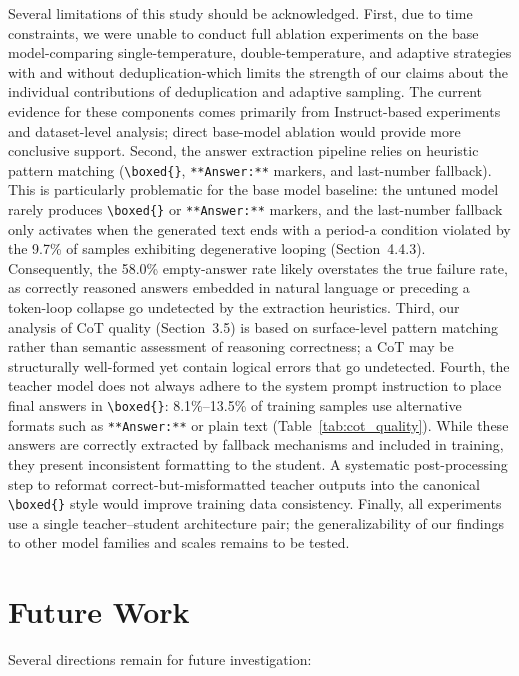 \documentclass{article}
\begin{document}
Several limitations of this study should be acknowledged. First, due to time constraints, we were unable to conduct full ablation experiments on the base model-comparing single-temperature, double-temperature, and adaptive strategies with and without deduplication-which limits the strength of our claims about the individual contributions of deduplication and adaptive sampling. The current evidence for these components comes primarily from Instruct-based experiments and dataset-level analysis; direct base-model ablation would provide more conclusive support. Second, the answer extraction pipeline relies on heuristic pattern matching (\texttt{\textbackslash{}boxed\{\}}, \texttt{**Answer:**} markers, and last-number fallback). This is particularly problematic for the base model baseline: the untuned model rarely produces \texttt{\textbackslash{}boxed\{\}} or \texttt{**Answer:**} markers, and the last-number fallback only activates when the generated text ends with a period-a condition violated by the 9.7\% of samples exhibiting degenerative looping (Section~4.4.3). Consequently, the 58.0\% empty-answer rate likely overstates the true failure rate, as correctly reasoned answers embedded in natural language or preceding a token-loop collapse go undetected by the extraction heuristics. Third, our analysis of CoT quality (Section~3.5) is based on surface-level pattern matching rather than semantic assessment of reasoning correctness; a CoT may be structurally well-formed yet contain logical errors that go undetected. Fourth, the teacher model does not always adhere to the system prompt instruction to place final answers in \texttt{\textbackslash{}boxed\{\}}: 8.1\%--13.5\% of training samples use alternative formats such as \texttt{**Answer:**} or plain text (Table~\ref{tab:cot_quality}). While these answers are correctly extracted by fallback mechanisms and included in training, they present inconsistent formatting to the student. A systematic post-processing step to reformat correct-but-misformatted teacher outputs into the canonical \texttt{\textbackslash{}boxed\{\}} style would improve training data consistency. Finally, all experiments use a single teacher–student architecture pair; the generalizability of our findings to other model families and scales remains to be tested.

\section{Future Work}

Several directions remain for future investigation:
\end{document}
